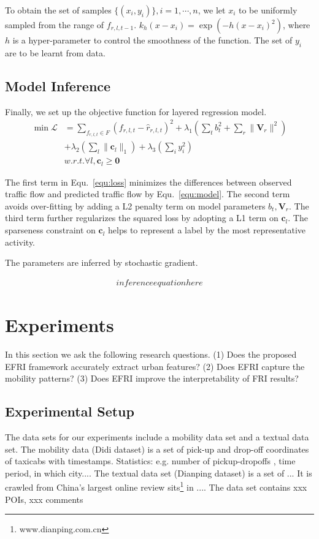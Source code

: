 \documentclass[runningheads]{llncs}
\begin{document}
To obtain the set of samples $\{(x_i,y_i)\},i=1,\cdots,n$, we let $x_i$ to be uniformly sampled from the range of $f_{r,l,t-1}$. $k_h(x-x_i)= \exp(-h (x-x_i)^2)$, where $h$ is a hyper-parameter to control the smoothness of the function. The set of $y_i$ are to be learnt from data.

\subsection{Model Inference}
Finally, we set up the objective function for layered regression model.
\begin{eqnarray}
\min \mathcal{L} & =\sum_{f_{r,l,t}\in F}(f_{r,l,t}-\hat{r}_{r,l,t})^2+\lambda_1 (\sum_t b_t^2  + \sum_r \|\mathbf{V}_r\|^2 )\\\nonumber
& +\lambda_2(\sum_l \|\mathbf{c}_l\|_1)+\lambda_3(\sum_i y_i^2)\\\nonumber
& w.r.t. \forall l, \mathbf{c}_l\geq \mathbf{0}
\label{equ:loss}
\end{eqnarray}

The first term in Equ.~\ref{equ:loss} minimizes the differences between observed traffic flow and predicted traffic flow by Equ.~\ref{equ:model}. The second term avoids over-fitting by adding a L2 penalty term on model parameters $b_t, \mathbf{V}_r$. The third term further regularizes the squared loss by adopting a L1 term on $\mathbf{c}_l$. The sparseness constraint on $\mathbf{c}_l$ helps to represent a label by the most representative activity. 

The parameters are inferred by stochastic gradient. 

\begin{eqnarray}
inference equation here
\label{equ:sgd}
\end{eqnarray}

\section{Experiments}\label{sec:experiments}
In this section we ask the following research questions. 
(1) Does the proposed EFRI framework accurately extract urban features?  
(2) Does EFRI capture the mobility patterns?
(3) Does EFRI improve the interpretability of FRI results?

\subsection{Experimental Setup}
The data sets for our experiments include a mobility data set and a textual data set.
The mobility data (Didi dataset) is a set of  pick-up and drop-off coordinates of taxicabs with timestamps.
Statistics: e.g. number of pickup-dropoffs , time period, in which city....
The textual data set (Dianping dataset) is a set of ...
It is crawled from China's largest online review sits\footnote{www.dianping.com.cn} in ....
The data set contains xxx POIs, xxx comments
\end{document}
